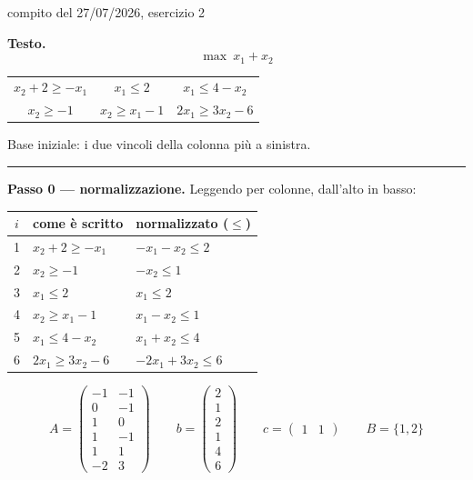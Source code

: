 \documentclass[11pt,a4paper]{article}
\begin{document}
\begin{es}{compito del 27/07/2026, esercizio 2}

\textbf{Testo.}
\[ \max\ x_1 + x_2 \]
\begin{center}
\begin{tabular}{@{}ccc@{}}
$x_2 + 2 \ge -x_1$ & $x_1 \le 2$ & $x_1 \le 4 - x_2$\\
$x_2 \ge -1$ & $x_2 \ge x_1 - 1$ & $2x_1 \ge 3x_2 - 6$
\end{tabular}
\end{center}
Base iniziale: i due vincoli della colonna più a sinistra.

\medskip
\hrule
\medskip

\textbf{Passo 0 --- normalizzazione.} Leggendo per colonne, dall'alto in basso:

\begin{center}
\begin{tabular}{@{}c l l@{}}
\toprule
$i$ & \textbf{come è scritto} & \textbf{normalizzato ($\le$)}\\
\midrule
1 & $x_2 + 2 \ge -x_1$ & $-x_1 - x_2 \le 2$\\
2 & $x_2 \ge -1$ & $-x_2 \le 1$\\
3 & $x_1 \le 2$ & $x_1 \le 2$\\
4 & $x_2 \ge x_1 - 1$ & $x_1 - x_2 \le 1$\\
5 & $x_1 \le 4 - x_2$ & $x_1 + x_2 \le 4$\\
6 & $2x_1 \ge 3x_2 - 6$ & $-2x_1 + 3x_2 \le 6$\\
\bottomrule
\end{tabular}
\end{center}

\[
A = \begin{pmatrix}
-1 & -1\\ 0 & -1\\ 1 & 0\\ 1 & -1\\ 1 & 1\\ -2 & 3
\end{pmatrix}
\qquad
b = \begin{pmatrix} 2\\ 1\\ 2\\ 1\\ 4\\ 6\end{pmatrix}
\qquad
c = \begin{pmatrix} 1 & 1\end{pmatrix}
\qquad
B = \{1,2\}
\]


\end{es}
\end{document}
